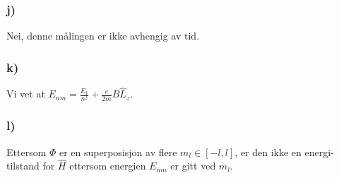 \documentclass{article}
\begin{document}
\subsubsection*{j)}
Nei, denne målingen er ikke avhengig av tid. 

\subsubsection*{k)}
Vi vet at $\displaystyle E_{nm} = \frac{E_1}{n^2} + \frac{e}{2m}B \hat{L}_z$. 

\subsubsection*{l)}
Ettersom $Φ$ er en superposisjon av flere $m_l ∈ [-l,l]$, er den ikke en energi-tilstand for $\hat{H}$ ettersom energien $E_{nm}$ er gitt ved $m_l$. 







\end{document}
